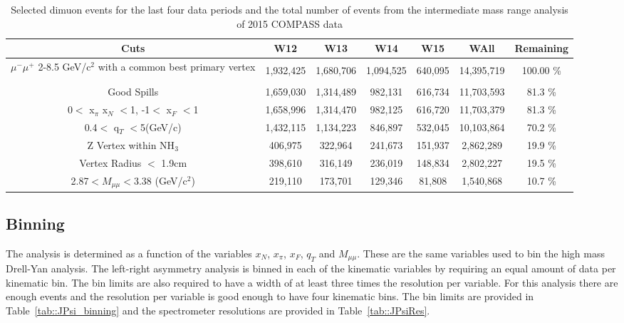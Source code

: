 \begin{table}[h!t]
  \begin{tabular}{ |c|c|c|c|c|c|c| }
    \hline \textbf{Cuts}& \textbf{W12}& \textbf{W13}& \textbf{W14}&
    \textbf{W15} & \textbf{WAll} & \textbf{Remaining} \\ \hline

    \multirow{3}{9em}{$\mu^-\mu^+$ 2-8.5 GeV/c$^2$ with a common best primary
      vertex}& & & & & & \\
    &1,932,425& 1,680,706& 1,094,525& 640,095& 14,395,719&
    100.00 \% \\ & & & & & & \\ \hline

    Good Spills& 1,659,030& 1,314,489& 982,131& 616,734& 11,703,593&
    81.3 \% \\ \hline

    0$<$ x$_{\pi}$ x$_N$ $<$1, -1$<$ x$_F$ $<$1&
    1,658,996& 1,314,470& 982,125& 616,720& 11,703,379&	81.3 \% \\ \hline

    0.4$<$ q$_T$ $<$5(GeV/c)&
    1,432,115& 1,134,223& 846,897& 532,045& 10,103,864&	70.2 \% \\ \hline

    Z Vertex within NH$_3$&
    406,975& 322,964& 241,673& 151,937&	2,862,289& 19.9  \% \\ \hline

    Vertex Radius $<$ 1.9cm&
    398,610& 316,149& 236,019& 148,834& 2,802,227& 19.5  \% \\ \hline

    2.87$< M_{\mu\mu} <$3.38 (GeV/c$^2$)&
    219,110& 173,701& 129,346& 81,808& 1,540,868& 10.7  \% \\ \hline
    
  \end{tabular}
  \caption{Selected dimuon events for the last four data periods and the total
    number of events from the intermediate mass range analysis of 2015 COMPASS
    data}
  \label{tab::JPsiStats2}
\end{table}


\subsection{Binning}

The analysis is determined as a function of the variables $x_N$, $x_{\pi}$,
$x_F$, $q_T$ and $M_{\mu\mu}$.  These are the same variables used to bin the
high mass Drell-Yan analysis.  The left-right asymmetry analysis is binned in
each of the kinematic variables by requiring an equal amount of data per
kinematic bin.  The bin limits are also required to have a width of at least
three times the resolution per variable.  For this analysis there are enough
events and the resolution per variable is good enough to have four kinematic
bins.  The bin limits are provided in Table~\ref{tab::JPsi_binning} and the
spectrometer resolutions are provided in Table~\ref{tab::JPsiRes}.

